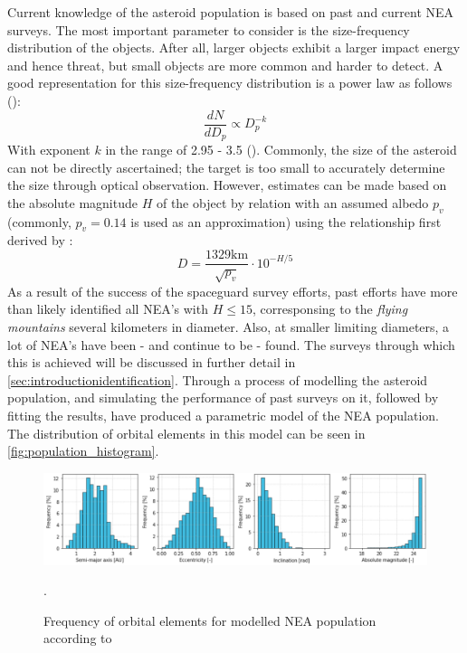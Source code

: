 Current knowledge of the asteroid population is based on past and current NEA surveys. The most important parameter to consider is the size-frequency distribution of the objects. After all, larger objects exhibit a larger impact energy and hence threat, but small objects are more common and harder to detect. A good representation for this size-frequency distribution is a power law as follows (\cite{HarrisPopulation}):
\begin{equation}
 \frac{dN}{dD_p} \propto D_p^{-k}
 \label{eq:sizefreqlaw}
\end{equation}
With exponent $k$ in the range of 2.95 - 3.5 (\cite{AsteroidSizeFrequency}). Commonly, the size of the asteroid can not be directly ascertained; the target is too small to accurately determine the size through optical observation. However, estimates can be made based on the absolute magnitude $H$ of the object by relation with an assumed albedo $p_v$ (commonly, $p_v = 0.14$ is used as an approximation) using the relationship first derived by \cite{AsteroidSizeAlbedo}:
\begin{equation}
 D = \frac{1329 \mathrm{km}}{\sqrt{p_v}}\cdot 10^{-H/5}
 \label{eq:asteroidsize}
\end{equation}
As a result of the success of the spaceguard survey efforts, past efforts have more than likely identified all NEA's with $H \leq 15$, corresponsing to the \textit{flying mountains} several kilometers in diameter. Also, at smaller limiting diameters, a lot of NEA's have been - and continue to be - found. The surveys through which this is achieved will be discussed in further detail in \autoref{sec:introductionidentification}. Through a process of modelling the asteroid population, and simulating the performance of past surveys on it, followed by fitting the results, \cite{GranvikPopulation} have produced a parametric model of the NEA population. The distribution of orbital elements in this model can be seen in \autoref{fig:population_histogram}. \\

\begin{figure}[htbp]
 \centering
 \includegraphics[width=1.0\textwidth]{img/population_histogram.png}
 \caption{Frequency of orbital elements for modelled NEA population according to \cite{GranvikPopulation}}.
 \label{fig:population_histogram}
\end{figure}

